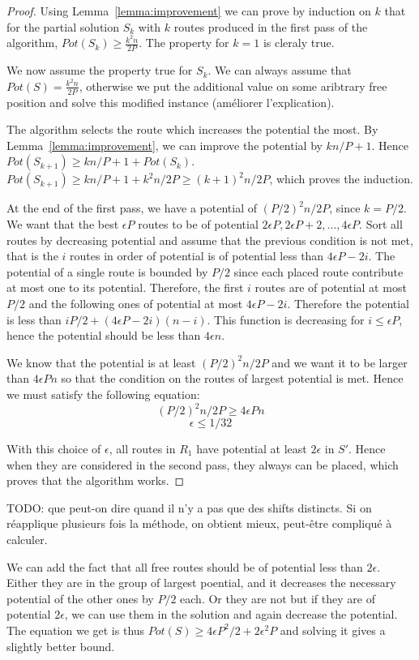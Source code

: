 \documentclass[10pt, conference, letterpaper]{IEEEtran}
\begin{document}
\begin{proof}
Using Lemma~\ref{lemma:improvement} we can prove by induction on $k$ that for the partial solution $S_k$ with $k$ routes produced in the first pass of the algorithm, $Pot(S_k) \geq \frac{k^2n}{2P}$.  The property for $k=1$ is cleraly true. 

We now assume the property true for $S_k$. 
We can always assume that $Pot(S) = \frac{k^2n}{2P}$, otherwise we put the additional value on some aribtrary free position and
solve this modified instance (améliorer l'explication).

The algorithm selects the route which increases the potential the most. By Lemma~\ref{lemma:improvement}, we can improve the potential by $kn/P + 1$. Hence $Pot(S_{k+1}) \geq kn/P + 1 + Pot(S_k)$. $Pot(S_{k+1}) \geq kn/P + 1 + k^2n/2P \geq (k+1)^2n/2P$, which proves the induction.

At the end of the first pass, we have a potential of $(P/2)^2n/2P$, since $k=P/2$. We want that the best $\epsilon P$ routes to be of potential $2\epsilon P, 2\epsilon P +2,\dots ,4\epsilon P$.
Sort all routes by decreasing potential and assume that the previous condition is not met, that is the $i$ routes in order
of potential is of potential less than $4\epsilon P - 2i$. The potential of a single route is bounded by $P/2$ since each placed route contribute at most one to its potential. Therefore, the first
$i$ routes are of potential at most $P/2$ and the following ones
of potential at most $4\epsilon P - 2i$. Therefore the potential
is less than $iP/2 + (4\epsilon P - 2i) (n -i)$. This function is decreasing for $i \leq \epsilon P$, hence the potential should be 
less than $4\epsilon n$.
 
 We know that the potential is at least $(P/2)^2n/2P$ and we want it to be larger than $4\epsilon P n$ so that the condition on the routes of largest potential is met.
Hence we must satisfy the following equation:
$$(P/2)^2n/2P \geq 4\epsilon P n$$
$$ \epsilon \leq 1/32$$

With this choice of $\epsilon$, all routes in $R_1$
have potential at least $2\epsilon$ in $S'$. Hence when they are considered in the second pass, they always can be placed, which proves that the algorithm works.
\end{proof}
TODO: que peut-on dire quand il n'y a pas que des shifts distincts.
Si on réapplique plusieurs fois la méthode, on obtient mieux, peut-être compliqué à calculer.

We can add the fact that all free routes should be of potential less than $2\epsilon$. Either they are in the group of largest poential, 
and it decreases the necessary potential of the other ones by $P/2$
each. Or they are not but if they are of potential $2\epsilon$,
we can use them in the solution and again decrease the potential.
The equation we get is thus $Pot(S) \geq 4\epsilon P^2/2 +2\epsilon^2 P$ and solving it gives a slightly better bound.
\end{document}
